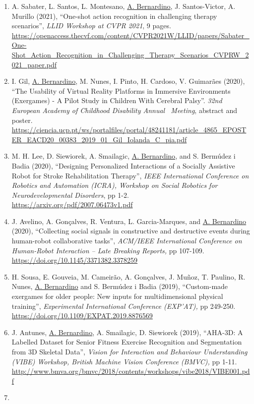 \begin{enumerate}
\item
  A. Sabater, L. Santos, L. Montesano, \ul{A. Bernardino}, J.
  Santos-Victor, A. Murillo (2021), ``One-shot action recognition in
  challenging therapy scenarios'', \emph{LLID Workshop at CVPR 2021}, 9
  pages.
  \url{https://openaccess.thecvf.com/content/CVPR2021W/LLID/papers/Sabater_One-Shot_Action_Recognition_in_Challenging_Therapy_Scenarios_CVPRW_2021_paper.pdf}
\item
  I. Gil, \ul{A. Bernardino}, M. Nunes, I. Pinto, H. Cardoso, V.
  Guimarães (2020), ``The Usability of Virtual Reality Platforms in
  Immersive Environments (Exergames) - A Pilot Study in Children With
  Cerebral Palsy''. \emph{32nd European Academy of Childhood Disability
  Annual~ Meeting}, abstract and poster.
  \url{https://ciencia.ucp.pt/ws/portalfiles/portal/48241181/article_4865_EPOSTER_EACD20_00383_2019_01_Gil_Iolanda_C_pia.pdf}
\item
  M. H. Lee, D. Siewiorek, A. Smailagic, \ul{A. Bernardino}, and S.
  Bermúdez i Badia (2020), ``Designing Personalized Interactions of a
  Socially Assistive Robot for Stroke Rehabilitation Therapy'',
  \emph{IEEE International Conference on Robotics and Automation (ICRA),
  Workshop on Social Robotics for Neurodevelopmental Disorders}, pp 1-2.
  \url{https://arxiv.org/pdf/2007.06473v1.pdf}~
\item
  J. Avelino, A. Gonçalves, R. Ventura, L. Garcia-Marques, and \ul{A.
  Bernardino} (2020), ``Collecting social signals in constructive and
  destructive events during human-robot collaborative tasks'',
  \emph{ACM/IEEE International Conference on Human-Robot Interaction --
  Late Breaking Reports,} pp 107-109.
  \url{https://doi.org/10.1145/3371382.3378259}~
\item
  H. Sousa, E. Gouveia, M. Cameirão, A. Gonçalves, J. Muñoz, T. Paulino,
  R. Nunes, \ul{A. Bernardino} and S. Bermúdez i Badia (2019),
  ``Custom-made exergames for older people: New inputs for
  multidimensional physical training'', \emph{Experimental International
  Conference (EXP'AT),} pp 249-250.
  \url{https://doi.org/10.1109/EXPAT.2019.8876569}~~
\item
  J. Antunes, \ul{A. Bernardino}, A. Smailagic, D. Siewiorek (2019),
  ``AHA-3D: A Labelled Dataset for Senior Fitness Exercise Recognition
  and Segmentation from 3D Skeletal Data'', \emph{Vision for Interaction
  and Behaviour Understanding (VIBE) Workshop, British Machine Vision
  Conference (BMVC),} pp 1-11.
  \url{http://www.bmva.org/bmvc/2018/contents/workshops/vibe2018/VIBE001.pdf}
\item

\end{enumerate}
